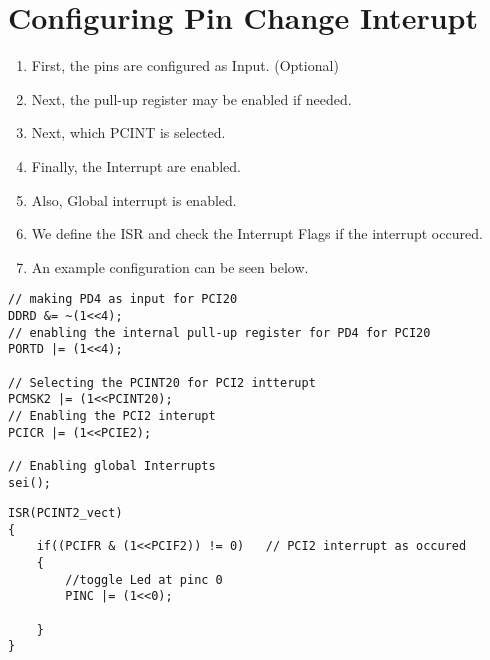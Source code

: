 \documentclass{article}
\begin{document}
\section{Configuring Pin Change Interupt}
\begin{enumerate}[label=(\Roman*)]
    \item First, the  pins are configured as Input. (Optional)
    \item Next, the pull-up register may be enabled if needed.
    \item Next, which PCINT is selected.
    \item Finally, the Interrupt are enabled.
    \item Also, Global interrupt is enabled.
    \item We define the ISR and check the Interrupt Flags if the interrupt occured.
    \item An example configuration can be seen below.
\end{enumerate}

\begin{minipage}{0.5\textwidth}
\begin{verbatim}
// making PD4 as input for PCI20
DDRD &= ~(1<<4);
// enabling the internal pull-up register for PD4 for PCI20
PORTD |= (1<<4);

// Selecting the PCINT20 for PCI2 intterupt
PCMSK2 |= (1<<PCINT20);
// Enabling the PCI2 interupt
PCICR |= (1<<PCIE2);

// Enabling global Interrupts
sei();	
\end{verbatim}
\end{minipage}
\begin{minipage}{0.45\textwidth}
\begin{verbatim}
ISR(PCINT2_vect)
{
    if((PCIFR & (1<<PCIF2)) != 0)	// PCI2 interrupt as occured
    {		
        //toggle Led at pinc 0
        PINC |= (1<<0);

    }
}
\end{verbatim}
\end{minipage}
\end{document}
